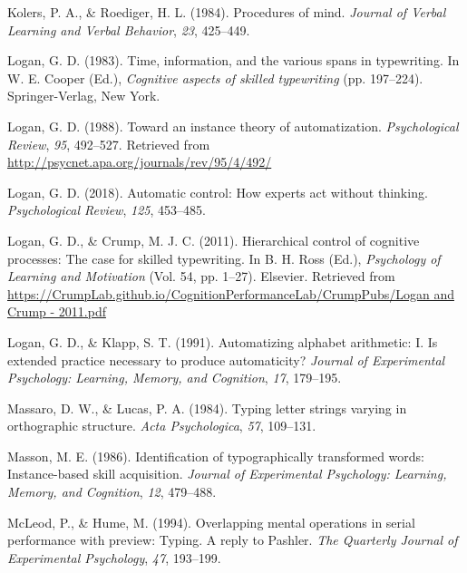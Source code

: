 \documentclass[floatsintext,man]{apa6}
\theoremstyle{definition}
\theoremstyle{definition}
\theoremstyle{definition}
\theoremstyle{remark}
\begin{document}
\hypertarget{ref-KolersProceduresmind1984}{}
Kolers, P. A., \& Roediger, H. L. (1984). Procedures of mind.
\emph{Journal of Verbal Learning and Verbal Behavior}, \emph{23},
425--449.

\hypertarget{ref-logan_span_1983}{}
Logan, G. D. (1983). Time, information, and the various spans in
typewriting. In W. E. Cooper (Ed.), \emph{Cognitive aspects of skilled
typewriting} (pp. 197--224). Springer-Verlag, New York.

\hypertarget{ref-logan_toward_1988}{}
Logan, G. D. (1988). Toward an instance theory of automatization.
\emph{Psychological Review}, \emph{95}, 492--527. Retrieved from
\url{http://psycnet.apa.org/journals/rev/95/4/492/}

\hypertarget{ref-logan_2018}{}
Logan, G. D. (2018). Automatic control: How experts act without
thinking. \emph{Psychological Review}, \emph{125}, 453--485.

\hypertarget{ref-logan_hierarchical_2011}{}
Logan, G. D., \& Crump, M. J. C. (2011). Hierarchical control of
cognitive processes: The case for skilled typewriting. In B. H. Ross
(Ed.), \emph{Psychology of Learning and Motivation} (Vol. 54, pp.
1--27). Elsevier. Retrieved from
\href{https://CrumpLab.github.io/CognitionPerformanceLab/CrumpPubs/Logan\%20and\%20Crump\%20-\%202011.pdf}{https://CrumpLab.github.io/CognitionPerformanceLab/CrumpPubs/Logan and Crump - 2011.pdf}

\hypertarget{ref-logan_automatizing_1991}{}
Logan, G. D., \& Klapp, S. T. (1991). Automatizing alphabet arithmetic:
I. Is extended practice necessary to produce automaticity? \emph{Journal
of Experimental Psychology: Learning, Memory, and Cognition}, \emph{17},
179--195.

\hypertarget{ref-massaro_typing_1984}{}
Massaro, D. W., \& Lucas, P. A. (1984). Typing letter strings varying in
orthographic structure. \emph{Acta Psychologica}, \emph{57}, 109--131.

\hypertarget{ref-MassonIdentificationtypographicallytransformed1986}{}
Masson, M. E. (1986). Identification of typographically transformed
words: Instance-based skill acquisition. \emph{Journal of Experimental
Psychology: Learning, Memory, and Cognition}, \emph{12}, 479--488.

\hypertarget{ref-mcleod_overlapping_1994}{}
McLeod, P., \& Hume, M. (1994). Overlapping mental operations in serial
performance with preview: Typing. A reply to Pashler. \emph{The
Quarterly Journal of Experimental Psychology}, \emph{47}, 193--199.
\end{document}
